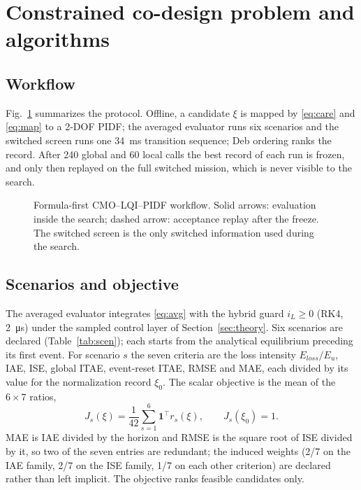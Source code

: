 \section{Constrained co-design problem and algorithms}\label{sec:problem}

\subsection{Workflow}
Fig.~\ref{fig:workflow} summarizes the protocol. Offline, a candidate $\xi$ is
mapped by \eqref{eq:care} and \eqref{eq:map} to a 2-DOF PIDF; the averaged
evaluator runs six scenarios and the switched screen runs one \SI{34}{ms} transition sequence; Deb ordering ranks the record. After 240 global and 60 local calls the
best record of each run is frozen, and only then replayed on the full switched
mission, which is never visible to the search.

\begin{figure}[t]
\centering
\resizebox{\textwidth}{!}{}
\caption{Formula-first CMO--LQI--PIDF workflow. Solid arrows: evaluation inside the search; dashed arrow: acceptance replay after the freeze. The switched screen is the only switched information used during the search.}
\label{fig:workflow}
\end{figure}

\subsection{Scenarios and objective}
The averaged evaluator integrates \eqref{eq:avg} with the hybrid guard $i_L\ge0$
(RK4, \SI{2}{\micro s}) under the sampled control layer of
Section~\ref{sec:theory}. Six scenarios are declared (Table~\ref{tab:scen}); each
starts from the analytical equilibrium preceding its first event. For scenario
$s$ the seven criteria are the loss intensity $E_{loss}/E_u$, IAE, ISE, global
ITAE, event-reset ITAE, RMSE and MAE, each divided by its value for the
normalization record $\xi_0$. The scalar objective is the mean of the $6\times7$
ratios,
\begin{equation}
J_s(\xi)=\frac{1}{42}\sum_{s=1}^{6}\mathbf 1^\top r_s(\xi),\qquad J_s(\xi_0)=1 .
\label{eq:J}
\end{equation}
MAE is IAE divided by the horizon and RMSE is the square root of ISE divided by
it, so two of the seven entries are redundant; the induced weights (2/7 on the
IAE family, 2/7 on the ISE family, 1/7 on each other criterion) are declared
rather than left implicit. The objective ranks feasible candidates only.

